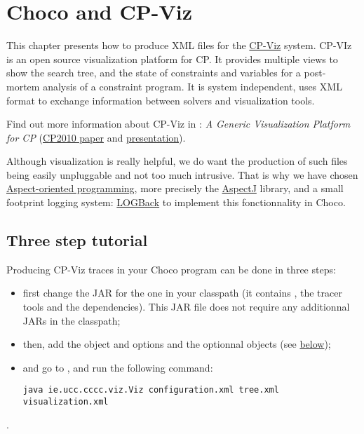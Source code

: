 \label{chocoandcpviz}
\hypertarget{chocoandcpviz}{}

\chapter{Choco and CP-Viz}\label{chocoandcpviz:chocoandcpviz}\hypertarget{chocoandcpviz:chocoandcpviz}{}

This chapter presents how to produce XML files for the \href{http://sourceforge.net/projects/cpviz/}{{CP-Viz}} system. CP-VIz is an open source visualization platform for CP. It provides multiple views to show the search tree, and the state of constraints and variables for a post- mortem analysis of a constraint program. It is system independent, uses XML format to exchange information between solvers and visualization tools.

\medskip
Find out more information about CP-Viz in  \cite{Simonis10}: \emph{A Generic Visualization Platform for CP} (\href{http://www.4c.ucc.ie/~hsimonis/cpviz-cp2010-paper.pdf}{{CP2010 paper}} and \href{http://www.4c.ucc.ie/~hsimonis/cpviz-cp2010-slides.pdf}{{presentation}}).

\medskip
Although visualization is really helpful, we do want the production of such files being easily unpluggable and not too much intrusive. That is why we have chosen \href{http://en.wikipedia.org/wiki/Aspect-oriented_programming}{{Aspect-oriented programming}}, more precisely the \href{http://www.eclipse.org/aspectj/}{{AspectJ}} library, and a small footprint logging system: \href{http://logback.qos.ch/}{{LOGBack}} to implement this fonctionnality in Choco. 

\section{Three step tutorial}\label{chocoandcpviz:3stepstuto}\hypertarget{chocoandcpviz:3stepstuto}{}

Producing CP-Viz traces in your Choco program can be done in three steps:

\begin{itemize}
\item first change the  JAR for the  one in your classpath (it contains , the tracer tools and the dependencies). This JAR file does not require any additionnal JARs in the classpath;
\item then, add the  object and options and the optionnal  objects (see \hyperlink{chocoandcpviz:visualizationandvisualizers}{below});
\item and go to , and run the following command:
\begin{lstlisting}
java ie.ucc.cccc.viz.Viz configuration.xml tree.xml visualization.xml
\end{lstlisting} 
\end{itemize}.

